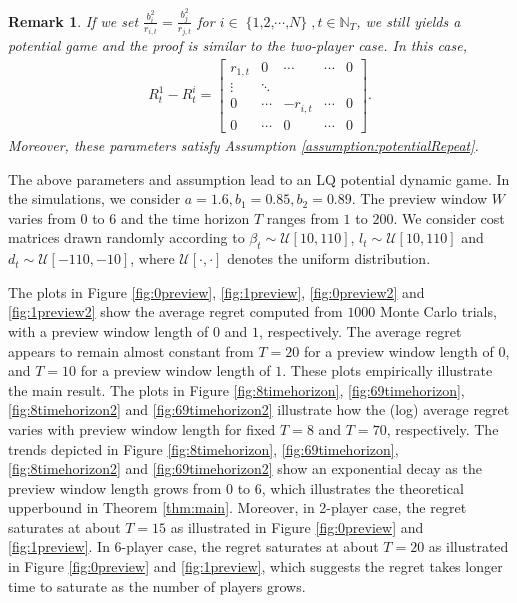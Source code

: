 \documentclass[letterpaper, 10 pt, conference]{ieeeconf}  %
\DeclareMathOperator{\Nplayers}{\{1,2,\cdots,\textit{N}\}}
\newtheorem{remark}{Remark}
\begin{document}
\begin{remark}
    If we set $\frac{b_{i}^{2}}{r_{i,t}}=\frac{b_{j}^{2}}{r_{j,t}}$ for $i \in \Nplayers, t\in \mathbb{N}_{T}$, we still yields a potential game and the proof is similar to the two-player case. In this case, 
    \begin{align*}
    R_{t}^{1}-R_{t}^{i}=
        \begin{bmatrix}
            r_{1,t} & 0 & \cdots & \cdots & 0\\
            \vdots & \ddots \\
            0 & \cdots & -r_{i,t} & \cdots & 0\\
            0 & \cdots & 0 & \cdots & 0
        \end{bmatrix}.
    \end{align*}
    Moreover, these parameters satisfy Assumption \ref{assumption:potentialRepeat}.
\end{remark}


The above parameters and assumption lead to an LQ potential dynamic game. In the simulations, we consider $a=1.6,b_{1}=0.85,b_{2} =0.89$.
The preview window $W$ varies from $0$ to $6$ and the time horizon $T$ ranges from $1$ to $200$. We consider cost matrices drawn randomly according to $\beta_{t} \sim \mathcal{U}[10,110]$, $l_{t} \sim \mathcal{U}[10,110]$ and $d_{t}\sim \mathcal{U}[-110,-10]$, where $\mathcal{U}[\cdot,\cdot]$ denotes the uniform distribution. 


The plots in Figure \ref{fig:0preview},  \ref{fig:1preview}, \ref{fig:0preview2} and \ref{fig:1preview2} show the average regret computed from $1000$ Monte Carlo trials, with a preview window length of {\color{red}$0$ and $1$}, respectively. The average regret appears to remain almost constant from $T = 20$ for a preview window length of $0$, and $T = 10$ for a preview window length of $1$. These plots empirically illustrate the main result. The plots in Figure \ref{fig:8timehorizon}, \ref{fig:69timehorizon}, \ref{fig:8timehorizon2} and \ref{fig:69timehorizon2} illustrate how the (log) average regret varies with preview window length for fixed $T=8$ and $T=70$, respectively. The trends depicted in Figure \ref{fig:8timehorizon}, \ref{fig:69timehorizon}, \ref{fig:8timehorizon2} and \ref{fig:69timehorizon2} show an exponential decay as the preview window length grows from $0$ to $6$, which illustrates the theoretical upperbound in Theorem \ref{thm:main}. Moreover, in 2-player case, the regret saturates at about $T=15$ as illustrated in Figure \ref{fig:0preview} and  \ref{fig:1preview}. In 6-player case, the regret saturates at about $T=20$ as illustrated in Figure \ref{fig:0preview} and  \ref{fig:1preview}, which suggests the regret takes longer time to saturate as the number of players grows.
\end{document}
